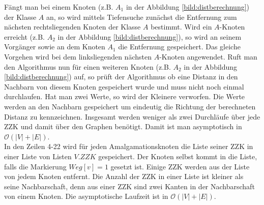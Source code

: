 Fängt man bei einem Knoten (z.B. $A_1$ in der Abbildung \ref{bild:distberechnung}) der Klasse $A$ an, so wird mittels Tiefensuche zunächst die Entfernung zum nächsten rechtsliegenden Knoten der Klasse $A$ bestimmt. Wird ein $A$-Knoten erreicht (z.B. $A_2$ in der Abbildung \ref{bild:distberechnung}), so wird an seinem Vorgänger sowie an dem Knoten $A_1$ die Entfernung gespeichert. Das gleiche Vorgehen wird bei dem linksliegenden nächsten $A$-Knoten angewendet. Ruft man den Algorithmus nun für einen weiteren Knoten (z.B. $A_2$ in der Abbildung \ref{bild:distberechnung}) auf, so prüft der Algorithmus ob eine Distanz in den Nachbarn von diesem Knoten gespeichert wurde und muss nicht noch einmal durchlaufen. Hat man zwei Werte, so wird der Kleinere verworfen.
Die Werte werden an den Nachbarn gespeichert um eindeutig die Richtung der berechneten Distanz zu kennzeichnen. Insgesamt werden weniger als zwei Durchläufe über jede ZZK und damit über den Graphen benötigt. Damit ist man asymptotisch in $\mathcal{O}(|V|+|E|)$.\\
In den Zeilen 4-22 wird für jeden Amalgamationsknoten die Liste seiner ZZK in einer Liste von Listen $V.ZZK$ gespeichert. Der Knoten selbst kommt in die Liste, falls die Markierung $Weg[v]=1$ gesetzt ist. Einige ZZK werden aus der Liste von jedem Knoten entfernt. Die Anzahl der ZZK in einer Liste ist kleiner als seine Nachbarschaft, denn aus einer ZZK sind zwei Kanten in der Nachbarschaft von einem Knoten. Die asymptotische Laufzeit ist in $\mathcal{O}(|V|+|E|)$.
\begin{algorithm}
\caption{$K(x)$}
\begin{algorithmic}[1]
\vspace{2mm} 
\ENDIF
\vspace{2mm}
\end{algorithmic}
\label{algberechnungkreis}
\end{algorithm}
~\linebreak

